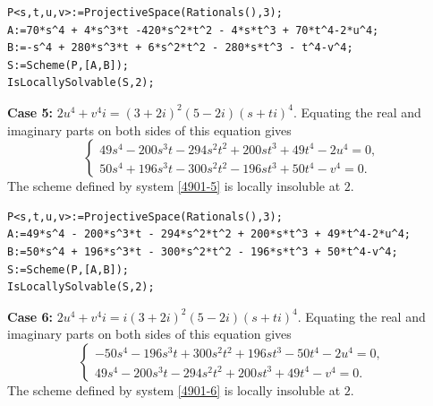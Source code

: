 \documentclass[a4paper,12pt,english,reqno]{amsart}
\begin{document}
\begin{lstlisting}
P<s,t,u,v>:=ProjectiveSpace(Rationals(),3);
A:=70*s^4 + 4*s^3*t -420*s^2*t^2 - 4*s*t^3 + 70*t^4-2*u^4;
B:=-s^4 + 280*s^3*t + 6*s^2*t^2 - 280*s*t^3 - t^4-v^4;
S:=Scheme(P,[A,B]);
IsLocallySolvable(S,2);
\end{lstlisting}

{\bf Case 5:} $2u^4+v^4i=(3+ 2i)^2(5-2i)(s+ti)^4$.  Equating the real and imaginary parts on both sides of this equation gives
\begin{equation}\label{4901-5}
\begin{cases}
49s^4 - 200s^3t - 294s^2t^2 + 200st^3 + 49t^4 - 2u^4=0,\\
50s^4 + 196s^3t - 300s^2t^2 - 196st^3 + 50t^4 - v^4=0.
\end{cases}
\end{equation}
The scheme defined by system \eqref{4901-5} is locally insoluble at $2$.

\begin{lstlisting}
P<s,t,u,v>:=ProjectiveSpace(Rationals(),3);
A:=49*s^4 - 200*s^3*t - 294*s^2*t^2 + 200*s*t^3 + 49*t^4-2*u^4;
B:=50*s^4 + 196*s^3*t - 300*s^2*t^2 - 196*s*t^3 + 50*t^4-v^4;
S:=Scheme(P,[A,B]);
IsLocallySolvable(S,2);
\end{lstlisting}



{\bf Case 6:} $2u^4+v^4i=i(3+ 2i)^2(5-2i)(s+ti)^4$.  Equating the real and imaginary parts on both sides of this equation gives
\begin{equation}\label{4901-6}
\begin{cases}
-50s^4 - 196s^3t + 300s^2t^2 + 196st^3 - 50t^4 - 2u^4=0,\\
49s^4 - 200s^3t - 294s^2t^2 + 200st^3 + 49t^4 - v^4=0.
\end{cases}
\end{equation}
The scheme defined by system \eqref{4901-6} is locally insoluble at $2$.
\end{document}
